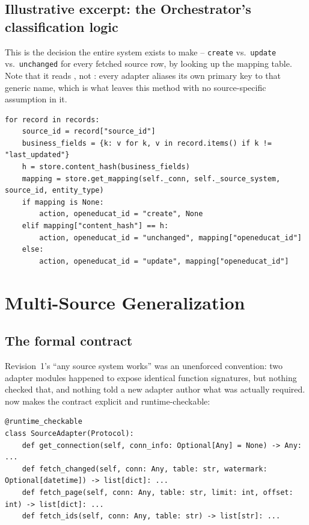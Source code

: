 \documentclass[11pt,a4paper]{article}
\newcommand{\ttu}[1]{\texttt{\detokenize{#1}}}
\begin{document}
\subsection{Illustrative excerpt: the Orchestrator's classification logic}

This is the decision the entire system exists to make -- \texttt{create} vs.\ \texttt{update}
vs.\ \texttt{unchanged} for every fetched source row, by looking up the mapping table. Note that
it reads \ttu{record["source_id"]}, not \ttu{record["pieas_id"]}: every adapter aliases its own
primary key to that generic name, which is what leaves this method with no source-specific
assumption in it.

\begin{lstlisting}[caption={\ttu{OrchestratorAgent.classify_records} (abridged).}]
for record in records:
    source_id = record["source_id"]
    business_fields = {k: v for k, v in record.items() if k != "last_updated"}
    h = store.content_hash(business_fields)
    mapping = store.get_mapping(self._conn, self._source_system, source_id, entity_type)
    if mapping is None:
        action, openeducat_id = "create", None
    elif mapping["content_hash"] == h:
        action, openeducat_id = "unchanged", mapping["openeducat_id"]
    else:
        action, openeducat_id = "update", mapping["openeducat_id"]
\end{lstlisting}

\section{Multi-Source Generalization}
\label{sec:multisource}

\subsection{The formal contract}

Revision~1's ``any source system works'' was an unenforced convention: two adapter modules
happened to expose identical function signatures, but nothing checked that, and nothing told a
new adapter author what was actually required. \ttu{source_adapter.py} now makes the contract
explicit and runtime-checkable:

\begin{lstlisting}[caption={The \texttt{SourceAdapter} Protocol -- the read path the Extractor
actually needs.}]
@runtime_checkable
class SourceAdapter(Protocol):
    def get_connection(self, conn_info: Optional[Any] = None) -> Any: ...
    def fetch_changed(self, conn: Any, table: str, watermark: Optional[datetime]) -> list[dict]: ...
    def fetch_page(self, conn: Any, table: str, limit: int, offset: int) -> list[dict]: ...
    def fetch_ids(self, conn: Any, table: str) -> list[str]: ...
\end{lstlisting}
\end{document}
